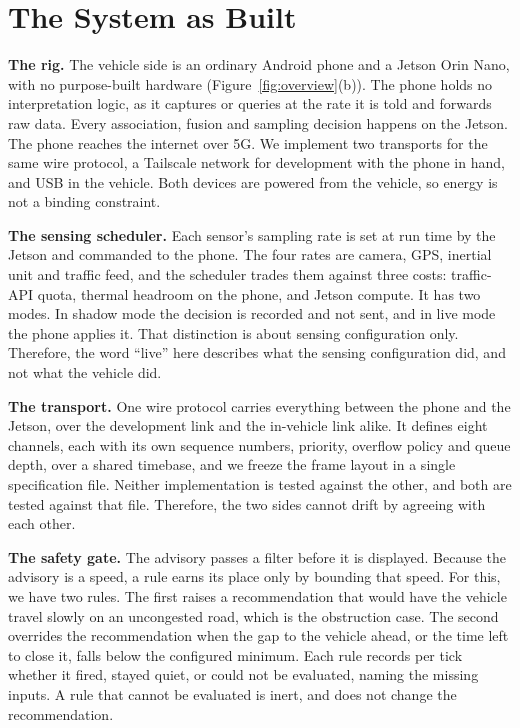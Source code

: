 \section{The System as Built}
\label{sec:architecture}

\noindent\textbf{The rig.} The vehicle side is an ordinary Android phone and a Jetson Orin Nano, with no purpose-built hardware (Figure~\ref{fig:overview}(b)). The phone holds no interpretation logic, as it captures or queries at the rate it is told and forwards raw data. Every association, fusion and sampling decision happens on the Jetson. The phone reaches the internet over 5G. We implement two transports for the same wire protocol, a Tailscale network for development with the phone in hand, and USB in the vehicle. Both devices are powered from the vehicle, so energy is not a binding constraint.

\noindent\textbf{The sensing scheduler.} Each sensor's sampling rate is set at run time by the Jetson and commanded to the phone. The four rates are camera, GPS, inertial unit and traffic feed, and the scheduler trades them against three costs: traffic-API quota, thermal headroom on the phone, and Jetson compute. It has two modes. In shadow mode the decision is recorded and not sent, and in live mode the phone applies it. That distinction is about sensing configuration only. Therefore, the word ``live'' here describes what the sensing configuration did, and not what the vehicle did.


\noindent\textbf{The transport.} One wire protocol carries everything between the phone and the Jetson, over the development link and the in-vehicle link alike. It defines eight channels, each with its own sequence numbers, priority, overflow policy and queue depth, over a shared timebase, and we freeze the frame layout in a single specification file. Neither implementation is tested against the other, and both are tested against that file. Therefore, the two sides cannot drift by agreeing with each other.


\noindent\textbf{The safety gate.} The advisory passes a filter before it is displayed. Because the advisory is a speed, a rule earns its place only by bounding that speed. For this, we have two rules. The first raises a recommendation that would have the vehicle travel slowly on an uncongested road, which is the obstruction case. The second overrides the recommendation when the gap to the vehicle ahead, or the time left to close it, falls below the configured minimum. Each rule records per tick whether it fired, stayed quiet, or could not be evaluated, naming the missing inputs. A rule that cannot be evaluated is inert, and does not change the recommendation.

